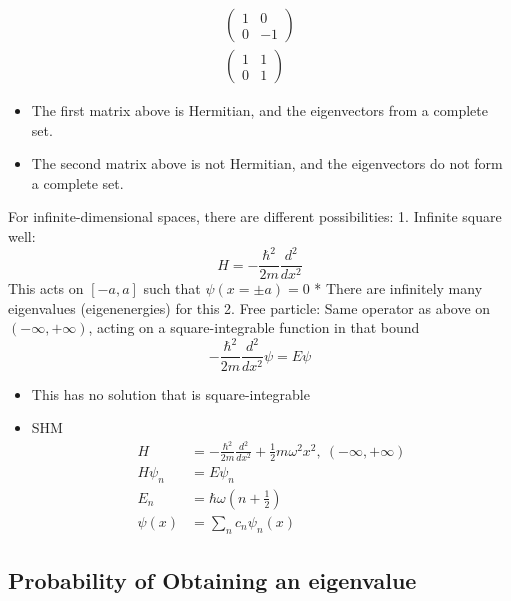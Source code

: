 \documentclass[a4paper,11pt,normalem]{article}
\begin{document}
\begin{example}[1st Workshop]
\[
    \begin{aligned}
    \begin{pmatrix} 1 & 0 \\ 0 & -1 \end{pmatrix} \\
    \begin{pmatrix} 1 & 1 \\ 0 & 1 \end{pmatrix}
    \end{aligned}
\]
\begin{itemize}
\item
  The first matrix above is Hermitian, and the eigenvectors from a
  complete set.
\item
  The second matrix above is not Hermitian, and the eigenvectors do not
  form a complete set.
\end{itemize}
For infinite-dimensional spaces, there are different possibilities: 1.
Infinite square well: \[
    H = -\frac{\hbar^2}{2m}\frac{d^2}{dx^2}
\] This acts on \([-a,a]\) such that \(\psi(x=\pm a) = 0\) * There are
infinitely many eigenvalues (eigenenergies) for this 2. Free particle:
Same operator as above on \((-\infty, +\infty)\), acting on a
square-integrable function in that bound \[
    -\frac{\hbar^2}{2m}\frac{d^2}{dx^2}\psi = E\psi
\]
\begin{itemize}
\item
  This has no solution that is square-integrable
\item
  SHM \[
  \begin{aligned}
  H &= -\frac{\hbar^2}{2m}\frac{d^2}{dx^2} + \frac{1}{2}m\omega^2x^2,~ (-\infty,+\infty) \\
  H\psi_n &= E\psi_n \\
  E_n &= \hbar\omega\left(n + \frac{1}{2}\right) \\
  \psi(x) &= \sum_n c_n\psi_n(x)
  \end{aligned}
  \]
\end{itemize}
\end{example}

\subsection{Probability of Obtaining an eigenvalue}\label{probability-of-obtaining-an-eigenvalue}
\end{document}
